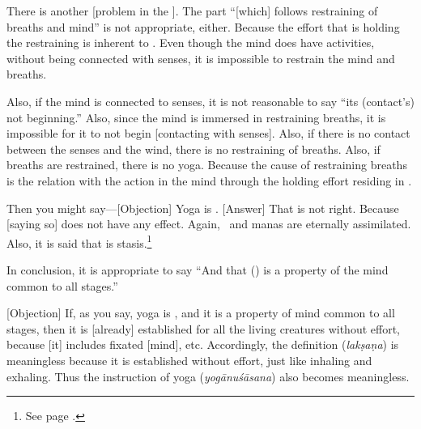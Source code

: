 There%
 is another [problem in the \sutra].  The part ``[which]
follows restraining of breaths and mind'' is not appropriate, either.
Because the effort that is holding the restraining is inherent to
\atman.  Even though the mind does have activities, without being
connected with senses, it is impossible to restrain the mind and
breaths.

Also,%
 if the mind is connected to senses, it is not reasonable to
say ``its (contact's) not beginning.''  Also, since the mind is immersed in
restraining breaths, it is impossible for it to not begin [contacting
with senses].  Also, if there is no contact between the senses and
the wind, there is no restraining of breaths.  Also, if breaths are 
restrained, there is no yoga.  Because the cause of restraining breaths
is the relation with the action in the mind through the holding effort
residing in \atman.

Then%
 you might say---[Objection] Yoga is \samadhi.  [Answer] %
That is not right.  Because [saying so] does not have any effect.  Again, \atman\ and manas are eternally assimilated.  Also, it is said that \samadhi\/ is stasis.\footnote{See page \pageref{station_immersion}.}

In%
 conclusion, it is appropriate to say ``And that (\samadhi) is
a property of the mind common to all stages.''

[Objection]%
 If, as you say, yoga is \samadhi, and it is a
property of mind common to all stages, then it is [already]
established for all the living creatures without effort, because [it]
includes fixated [mind], etc.  Accordingly, the definition (\emph{lakṣaṇa})
is meaningless because it is established without effort, just
like inhaling and exhaling.  Thus the instruction of yoga (\emph{yogānuśāsana}) also becomes meaningless.

